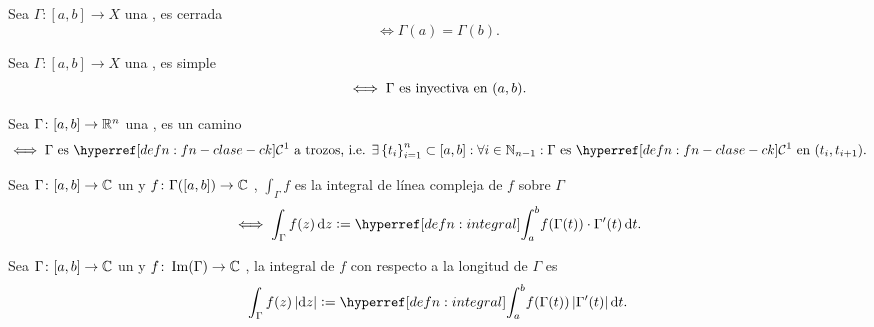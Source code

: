 \begin{defn}\label{defn:curva-cerrada}
    Sea $\Gamma \colon [a, b] \to X$ una , es cerrada
    \[
    \iff \Gamma(a) = \Gamma(b).
    \]
\end{defn}

\begin{defn}\label{defn:curva-simple}
    Sea $\Gamma \colon [a, b] \to X$ una , es simple
    \[
    \iff \Gamma \text{ es inyectiva en }(a, b).
    \]
\end{defn}


\begin{defn}[camino]\label{defn:camino}
    Sea $\Gamma \colon [a, b] \to \mathbb{R}^n$ una , es un camino
    \[
    \iff \Gamma \tex{ es } \exhyperref[defn:fn-clase-ck]{fn-clase-ck}{\mathcal{C}^1} \tex{ a trozos, i.e. }\exists \left\{t_i\right\}_{i=1}^{n} \subset [a, b] : \forall i \in \N_{n-1} : \Gamma \tex{ es } \exhyperref[defn:fn-clase-ck]{fn-clase-ck}{\mathcal{C}^1} \tex{ en } (t_i, t_{i+1}).
    \]
\end{defn}    



\begin{defn}\label{defn:integral-linea-compleja}
    Sea $\Gamma \colon [a, b] \to \mathbb{C}$ un  y $f \colon \Gamma([a, b]) \to \mathbb{C}$ , $\int_\Gamma f$ es la integral de línea compleja de $f$ sobre $\Gamma$
    \[
    \iff \int_{\Gamma} f(z) \odif{z} \defeq \exhyperref[defn:integral]{integral}{\int_a^b} f(\Gamma(t)) \cdot \Gamma'(t) \odif{t}.
    \]
\end{defn}

\begin{defn}\label{defn:integral-linea-compleja-longitud}
    Sea $\Gamma \colon [a, b] \to \mathbb{C}$ un  y $f \colon \operatorname{Im}(\Gamma) \to \mathbb{C}$ , la integral de $f$ con respecto a la longitud de $\Gamma$ es
    \[
    \int_{\Gamma} f(z) \abs{\odif{z}} \defeq \exhyperref[defn:integral]{integral}{\int_a^b} f(\Gamma(t)) \abs{\Gamma'(t)} \odif{t}.
   \]
\end{defn}


